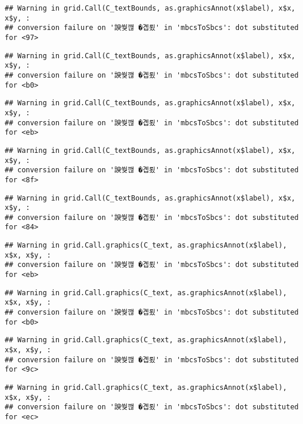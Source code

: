 \documentclass[
]{article}
\begin{document}
\begin{verbatim}
## Warning in grid.Call(C_textBounds, as.graphicsAnnot(x$label), x$x, x$y, :
## conversion failure on '諛쒖깮 �곕룄' in 'mbcsToSbcs': dot substituted for <97>
\end{verbatim}

\begin{verbatim}
## Warning in grid.Call(C_textBounds, as.graphicsAnnot(x$label), x$x, x$y, :
## conversion failure on '諛쒖깮 �곕룄' in 'mbcsToSbcs': dot substituted for <b0>
\end{verbatim}

\begin{verbatim}
## Warning in grid.Call(C_textBounds, as.graphicsAnnot(x$label), x$x, x$y, :
## conversion failure on '諛쒖깮 �곕룄' in 'mbcsToSbcs': dot substituted for <eb>
\end{verbatim}

\begin{verbatim}
## Warning in grid.Call(C_textBounds, as.graphicsAnnot(x$label), x$x, x$y, :
## conversion failure on '諛쒖깮 �곕룄' in 'mbcsToSbcs': dot substituted for <8f>
\end{verbatim}

\begin{verbatim}
## Warning in grid.Call(C_textBounds, as.graphicsAnnot(x$label), x$x, x$y, :
## conversion failure on '諛쒖깮 �곕룄' in 'mbcsToSbcs': dot substituted for <84>
\end{verbatim}

\begin{verbatim}
## Warning in grid.Call.graphics(C_text, as.graphicsAnnot(x$label), x$x, x$y, :
## conversion failure on '諛쒖깮 �곕룄' in 'mbcsToSbcs': dot substituted for <eb>
\end{verbatim}

\begin{verbatim}
## Warning in grid.Call.graphics(C_text, as.graphicsAnnot(x$label), x$x, x$y, :
## conversion failure on '諛쒖깮 �곕룄' in 'mbcsToSbcs': dot substituted for <b0>
\end{verbatim}

\begin{verbatim}
## Warning in grid.Call.graphics(C_text, as.graphicsAnnot(x$label), x$x, x$y, :
## conversion failure on '諛쒖깮 �곕룄' in 'mbcsToSbcs': dot substituted for <9c>
\end{verbatim}

\begin{verbatim}
## Warning in grid.Call.graphics(C_text, as.graphicsAnnot(x$label), x$x, x$y, :
## conversion failure on '諛쒖깮 �곕룄' in 'mbcsToSbcs': dot substituted for <ec>
\end{verbatim}
\end{document}
